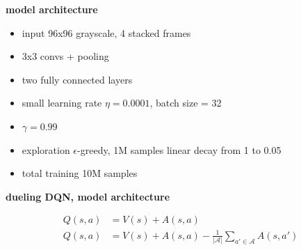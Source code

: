 \documentclass[xcolor=dvipsnames]{beamer}
\begin{document}
\begin{frame}{\bf model architecture}


  \begin{itemize}
    \item input 96x96 grayscale, 4 stacked frames
    \item 3x3 convs + pooling
    \item two fully connected layers
    \item small learning rate $\eta = 0.0001$, batch size = 32
    \item $\gamma = 0.99$
    \item exploration $\epsilon$-greedy, 1M samples linear decay from 1 to 0.05
    \item total training 10M samples
  \end{itemize}
 
\end{frame}






\begin{frame}{\bf dueling DQN, model architecture}


  \begin{align*}
    Q(s, a) &= V(s) + A(s, a) \\
    Q(s, a) &= V(s) + A(s, a) - \frac{1}{|\mathcal{A}|}\sum_{a' \in \mathcal{A}}A(s, a')
  \end{align*}


\end{frame}
\end{document}
